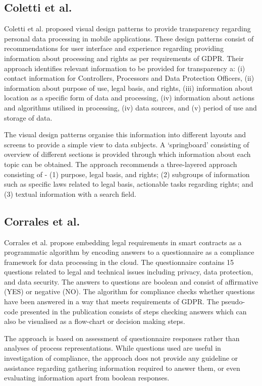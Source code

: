 \subsection*{Coletti et al.}
Coletti et al. \cite{kurosu_design_2019} proposed visual design patterns to provide transparency regarding personal data processing in mobile applications. These design patterns consist of recommendations for user interface and experience regarding providing information about processing and rights as per requirements of GDPR. Their approach identifies relevant information to be provided for transparency a: (i) contact information for Controllers, Processors and Data Protection Officers, (ii) information about purpose of use, legal basis, and rights, (iii) information about location as a specific form of data and processing, (iv) information about actions and algorithms utilised in processing, (iv) data sources, and (v) period of use and storage of data.

The visual design patterns organise this information into different layouts and screens to provide a simple view to data subjects. A `springboard' consisting of overview of different sections is provided through which information about each topic can be obtained. The approach recommends a three-layered approach consisting of - (1) purpose, legal basis, and rights; (2) subgroups of information such as specific laws related to legal basis, actionable tasks regarding rights; and (3) textual information with a search field.

\subsection*{Corrales et al.}
Corrales et al. \cite{corrales_smart_2019} propose embedding legal requirements in smart contracts as a programmatic algorithm by encoding answers to a questionnaire as a compliance framework for data processing in the cloud. The questionnaire contains 15 questions related to legal and technical issues including privacy, data protection, and data security. The answers to questions are boolean and consist of affirmative (YES) or negative (NO). The algorithm for compliance checks whether questions have been answered in a way that meets requirements of GDPR. The pseudo-code presented in the publication consists of steps checking answers which can also be visualised as a flow-chart or decision making steps.

The approach is based on assessment of questionnaire responses rather than analyses of process representations. While questions used are useful in investigation of compliance, the approach does not provide any guideline or assistance regarding gathering information required to answer them, or even evaluating information apart from boolean responses.

